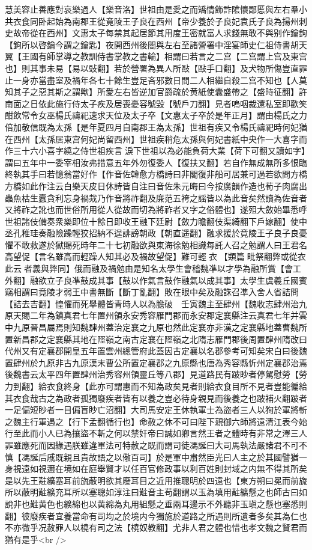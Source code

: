 慧美容止善應對哀樂過人【樂音洛】世祖由是愛之而矯情飾詐隂懷鄙慝與左右羣小共衣食同卧起始為南郡王從竟陵王子良在西州【帝少養於子良妃袁氏子良為揚州刺史故帝從在西州】文惠太子每禁其起居節其用度王密就富人求錢無敢不與别作鑰鉤【鉤所以啓鑰今謂之鑰匙】夜開西州後閤與左右至諸營署中淫宴師史仁祖侍書胡天翼【王國有師掌導之教訓侍書掌教之書輪】相謂曰若言之二宫【二宫謂上宫及東宫也】則其事未易【易以䜴翻】若於營署為異人所敺【敺手口翻】及犬物所傷豈直罪止一身亦當盡室及禍年各七十餘生豈足吝邪數日間二人相繼自殺二宫不知也【人莫知其子之惡其斯之謂歟】所愛左右皆逆加官爵疏於黄紙使囊盛帶之【盛時征翻】許南面之日依此施行侍太子疾及居喪憂容號毀【號戶刀翻】見者嗚咽裁還私室即歡笑酣飲常令女巫楊氏禱祀速求天位及太子卒【文惠太子卒於是年正月】謂由楊氏之力倍加敬信既為太孫【是年夏四月自南郡王為太孫】世祖有疾又令楊氏禱祀時何妃猶在西州【太孫居東宫何妃尚留西州】世祖疾稍危太孫與何妃書紙中央作一大喜字而作三十六小喜字繞之侍世祖疾言淚下世祖以為必能負荷大業【荷下可翻又讀如字】謂曰五年中一委宰相汝弗措意五年外勿復委人【復扶又翻】若自作無成無所多恨臨終執其手曰若憶翁當好作【作音佐韓愈方橋詩曰非閣復非船可居兼可過若欲問方橋方橋如此作注云白樂天皮日休詩皆自注曰音佐朱元晦曰今按廣韻作造也荀子肉腐出蟲魚枯生蠧貪利忘身禍烖乃作音將祚翻及廉范五袴之謡皆以為此音矣然讀為佐音者又將祚之訛也而世俗所用從人從故而切為將祚者又字之俗體也】遂殂大斂始畢悉呼世祖諸伎備奏衆樂即位十餘日即收王融下廷尉【斂力瞻翻伎渠綺翻下戶嫁翻】使中丞孔稚珪奏融險躁輕狡招納不逞誹謗朝政【朝直遥翻】融求援於竟陵王子良子良憂懼不敢救遂於獄賜死時年二十七初融欲與東海徐勉相識每託人召之勉謂人曰王君名高望促【言名雖高而輕躁人知其必及禍故望促】難可輕衣【類篇毗祭翻弊或從衣此云者義與弊同】俄而融及禍勉由是知名太學生會稽魏凖以才學為融所賞【會工外翻】融欲立子良凖鼓成其事【鼓以作氣言鼓作融氣以成其事】太學生虞羲丘國賓竊相謂曰竟陵才弱王中書無斷【斷丁亂翻】敗在眼中矣及融誅召凖入舍人省詰問【詰去吉翻】惶懼而死舉體皆青時人以為膽破　壬寅魏主至肆州【魏收志肆州治九原天賜二年為鎮真君七年置州領永安秀容雁門郡而永安郡定襄縣注云真君七年并雲中九原晉昌屬焉則知魏肆州蓋治定襄之九原也然此定襄亦非漢之定襄縣地蓋曹魏所置新昌郡之定襄縣其地在陘嶺之南古定襄在陘嶺之北隋志雁門郡後周置肆州隋改曰代州又有定襄郡開皇五年置雲州總管府此蓋因古定襄以名郡參考可知矣宋白曰後魏置肆州於九原非古九原漢末曹公所置定襄郡之九原縣也唐為秀容縣忻州定襄郡治焉後魏書云太平四年置肆州治秀容州領靈丘等八郡】見道路民有跛眇者停駕慰勞【勞力到翻】給衣食終身【此亦可謂惠而不知為政矣見者則給衣食目所不見者豈能徧給其衣食哉古之為政者孤獨廢疾者皆有以養之豈必待身親見而後養之也跛補火翻跛者一足偏短眇者一目偏盲眇亡沼翻】大司馬安定王休執軍士為盜者三人以狥於軍將斬之魏主行軍遇之【行下孟翻循行也】命赦之休不可曰陛下親御六師將遠清江表今始行至此而小人已為攘盜不斬之何以禁奸帝曰誠如卿言然王者之體時有非常之澤三人罪雖應死而因緣遇朕雖違軍法可特赦之既而謂司徒馮誕曰大司馬執法嚴諸君不可不慎【馮誕后戚既親且貴故語之以儆百司】於是軍中肅然臣光曰人主之於其國譬猶一身視遠如視邇在境如在庭舉賢才以任百官修政事以利百姓則封域之内無不得其所矣是以先王黈纊塞耳前旒蔽明欲其廢耳目之近用推聰明於四遠也【東方朔曰冕而前旒所以蔽明黈纊充耳所以塞聰如淳注曰黈音主苟翻謂以玉為填用黈纊懸之也師古曰如說非也黈黄色也纊綿也以黄綿為丸用組懸之垂兩耳邊示不外聽非玉瑱之懸也塞悉則翻】彼廢疾者宜養當命有司均之於境内今獨施於道路之所遇則所遺者多矣其為仁也不亦微乎况赦罪人以橈有司之法【橈奴教翻】尤非人君之體也惜也孝文魏之賢君而猶有是乎<br />
